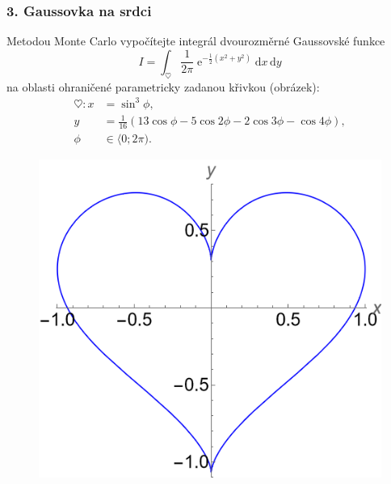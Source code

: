 \documentclass[a4paper,11pt,twoside]{article}
\DeclareMathOperator{\e}{e}
\renewcommand{\d}{\mathrm{d}}
\begin{document}
\subsubsection*{3. Gaussovka na srdci}
    Metodou Monte Carlo vypočítejte integrál dvourozměrné Gaussovské funkce
    \begin{equation*}
        I=\int_{\heartsuit}\frac{1}{2\pi}\e^{-\frac{1}{2}\left(x^{2}+y^{2}\right)}\d x\,\d y
    \end{equation*}
    na oblasti ohraničené parametricky zadanou křivkou (obrázek):
    \begin{align*}
        \heartsuit: 
            x&=\sin^{3}{\phi},\\
            y&=\frac{1}{16}\left(13\cos{\phi}-5\cos{2\phi}-2\cos{3\phi}-\cos{4\phi}\right),\\
            \phi&\in\langle0;2\pi).
    \end{align*}
    \begin{figure}[!h]
        \centering
        \includegraphics[width=0.41\linewidth]{heart.png}
    \end{figure}
\end{document}

